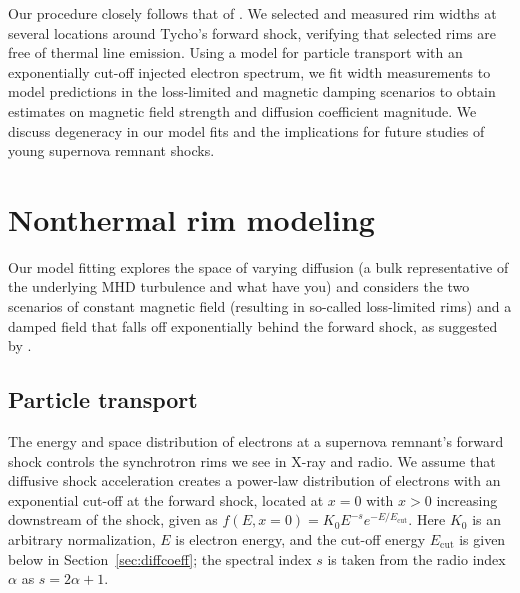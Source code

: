 \documentclass[iop, apj, numberedappendix]{emulateapj}
\newcommand*{\mt}{\mathrm}
\newcommand*{\Ecut}{E_{\mt{cut}}}
\begin{document}
Our procedure closely follows that of .
We selected and measured rim widths at several locations around Tycho's forward
shock, verifying that selected rims are free of thermal line emission.  Using a
model for particle transport with an exponentially cut-off injected electron
spectrum, we fit width measurements to model predictions in the loss-limited
and magnetic damping scenarios to obtain estimates on magnetic field strength
and diffusion coefficient magnitude.  We discuss degeneracy in our model fits
and the implications for future studies of young supernova remnant shocks.

\section{Nonthermal rim modeling}\label{sec:models}


Our model fitting explores the space of varying diffusion (a bulk
representative of the underlying MHD turbulence and what have you)
and considers the two scenarios of constant magnetic field (resulting in
so-called loss-limited rims) and a damped field that falls off exponentially
behind the forward shock, as suggested by \citet{pohl2005}.

\subsection{Particle transport}\label{sec:transport}

The energy and space distribution of electrons at a supernova remnant's forward
shock controls the synchrotron rims we see in X-ray and radio.  We assume that
diffusive shock acceleration creates a power-law distribution of electrons with
an exponential cut-off at the forward shock, located at $x = 0$ with $x > 0$
increasing downstream of the shock, given as
$f(E,x=0) = K_0 E^{-s} e^{-E/\Ecut}$.  Here $K_0$ is an arbitrary
normalization, $E$ is electron energy, and the cut-off energy $\Ecut$ is given
below in Section~\ref{sec:diffcoeff}; the spectral index $s$ is taken from
the radio index $\alpha$ as $s = 2\alpha + 1$.
\end{document}
